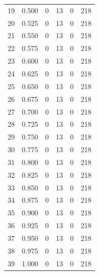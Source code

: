 \documentclass[a4paper,twoside,12pt]{book}
\begin{document}
\begin{appendices}
\begin{table}
\begin{tabular}{lrrrrr}
		19 &  0.500 &         0 &        13 &               0 &             218 \\
		20 &  0.525 &         0 &        13 &               0 &             218 \\
		21 &  0.550 &         0 &        13 &               0 &             218 \\
		22 &  0.575 &         0 &        13 &               0 &             218 \\
		23 &  0.600 &         0 &        13 &               0 &             218 \\
		24 &  0.625 &         0 &        13 &               0 &             218 \\
		25 &  0.650 &         0 &        13 &               0 &             218 \\
		26 &  0.675 &         0 &        13 &               0 &             218 \\
		27 &  0.700 &         0 &        13 &               0 &             218 \\
		28 &  0.725 &         0 &        13 &               0 &             218 \\
		29 &  0.750 &         0 &        13 &               0 &             218 \\
		30 &  0.775 &         0 &        13 &               0 &             218 \\
		31 &  0.800 &         0 &        13 &               0 &             218 \\
		32 &  0.825 &         0 &        13 &               0 &             218 \\
		33 &  0.850 &         0 &        13 &               0 &             218 \\
		34 &  0.875 &         0 &        13 &               0 &             218 \\
		35 &  0.900 &         0 &        13 &               0 &             218 \\
		36 &  0.925 &         0 &        13 &               0 &             218 \\
		37 &  0.950 &         0 &        13 &               0 &             218 \\
		38 &  0.975 &         0 &        13 &               0 &             218 \\
		39 &  1.000 &         0 &        13 &               0 &             218 \\
		\bottomrule
	\end{tabular}
\end{table}



\end{appendices}
\end{document}
